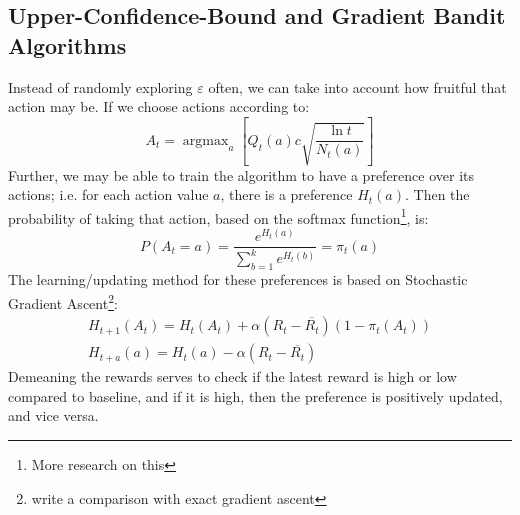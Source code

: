\documentclass[12pt, reqno]{article}
\theoremstyle{plain}    \newtheorem{theorem}{Theorem}[section]
\theoremstyle{plain}    \newtheorem{lemma}[theorem]{Lemma}
\theoremstyle{plain}    \newtheorem{claim}[theorem]{Claim}
\theoremstyle{plain}    \newtheorem{definition}{Definition}[section]
\theoremstyle{plain}    \newtheorem{proposition}[theorem]{Proposition}
\theoremstyle{plain}    \newtheorem{corollary}[theorem]{Corollary}
\theoremstyle{plain}    \newtheorem{example}[definition]{Example}
\DeclareMathOperator*{\argmax}{argmax}
\newcommand{\eps}{\varepsilon}
\numberwithin{equation}{section}
\begin{document}
\subsection{Upper-Confidence-Bound and Gradient Bandit Algorithms}
Instead of randomly exploring \(\eps\) often, we can take into account how
fruitful that action may be. If we choose actions according to:
\[A_t = \argmax_a \left[Q_t(a) c \sqrt{\frac{\ln t}{N_t(a)}}\right]\]
Further, we may be able to train the algorithm to have a preference over its
actions; i.e. for each action value \(a\), there is a preference \(H_t(a)\).
Then the probability of taking that action, based on the softmax
function\footnote{More research on this}, is:
\[P(A_t = a) = \frac{e^{H_t(a)}}{\sum_{b=1}^{k}e^{H_t(b)}} = \pi_t(a)\]
The learning/updating method for these preferences is based on Stochastic
Gradient Ascent\footnote{write a comparison with exact gradient ascent}:
\begin{gather*}
	H_{t+1}(A_t) = H_t(A_t) + \alpha(R_t - \overline{R_t})(1 - \pi_t(A_t))\\
	H_{t+a}(a) = H_t(a) - \alpha(R_t - \overline{R_t}) 
\end{gather*}
Demeaning the rewards serves to check if the latest reward is high or low
compared to baseline, and if it is high, then the preference is positively
updated, and vice versa. 
\end{document}
